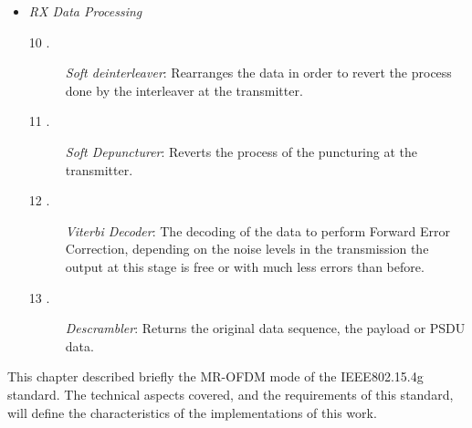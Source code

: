 \begin{itemize}
\item \emph{RX Data Processing}

\begin{description}
\item [10 .] \emph{Soft deinterleaver}: Rearranges the data in order to revert the process done by the interleaver at the transmitter. 

\item [11 .] \emph{Soft Depuncturer}: Reverts the process of the puncturing at the transmitter. 

\item [12 .] \emph{Viterbi Decoder}: The decoding of the data to perform Forward Error Correction, depending on the noise levels in the transmission the output at this stage is free or with much less errors than before.  

\item [13 .] \emph{Descrambler}: Returns the original data sequence, the payload or PSDU data.  

\end{description}

\end{itemize}


This chapter described briefly the MR-OFDM mode of the IEEE802.15.4g standard. The technical aspects covered, and the requirements of this standard, will define the characteristics of the implementations of this work. 

